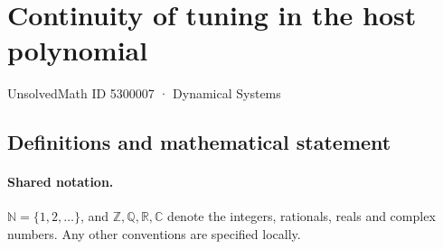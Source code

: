 \documentclass[11pt]{article}
\begin{document}
\setcounter{section}{5300006}
\section{Continuity of tuning in the host polynomial}\label{5300007}
{\small\sffamily UnsolvedMath ID 5300007 · Dynamical Systems}
\subsection{Definitions and mathematical statement}

\paragraph{Shared notation.}$\mathbb N=\{1,2,\ldots\}$, and $\mathbb Z,\mathbb Q,\mathbb R,\mathbb C$ denote the integers, rationals, reals and complex numbers. Any other conventions are specified locally.
\end{document}
